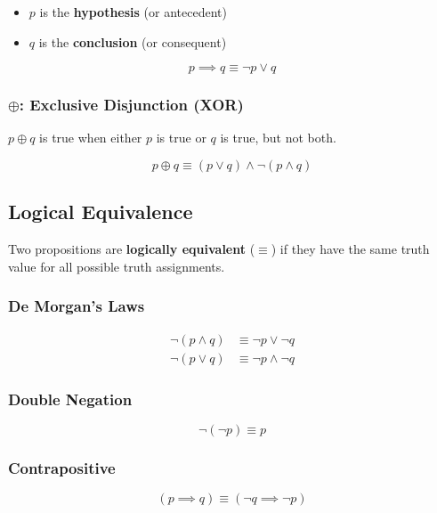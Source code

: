 \documentclass{report}
\begin{document}
\begin{itemize}
    \item $p$ is the \textbf{hypothesis} (or antecedent)
    \item $q$ is the \textbf{conclusion} (or consequent)
\end{itemize}

\begin{equation}
    p \implies q \equiv \lnot p \lor q
\end{equation}

\subsubsection{$\oplus$: Exclusive Disjunction (XOR)}

$p \oplus q$ is true when either $p$ is true or $q$ is true, but not both.

\begin{equation}
    p \oplus q \equiv (p \lor q) \land \lnot(p \land q)
\end{equation}

\subsection{Logical Equivalence}

Two propositions are \textbf{logically equivalent} ($\equiv$) if they have the same truth value for all possible truth assignments.

\subsubsection{De Morgan's Laws}
\begin{align}
    \neg(p \land q) &\equiv \neg p \lor \neg q \\
    \neg(p \lor q) &\equiv \neg p \land \neg q
\end{align}

\subsubsection{Double Negation}
\begin{equation}
    \neg(\neg p) \equiv p
\end{equation}

\subsubsection{Contrapositive}
\begin{equation}
    (p \implies q) \equiv (\neg q \implies \neg p)
\end{equation}
\end{document}
